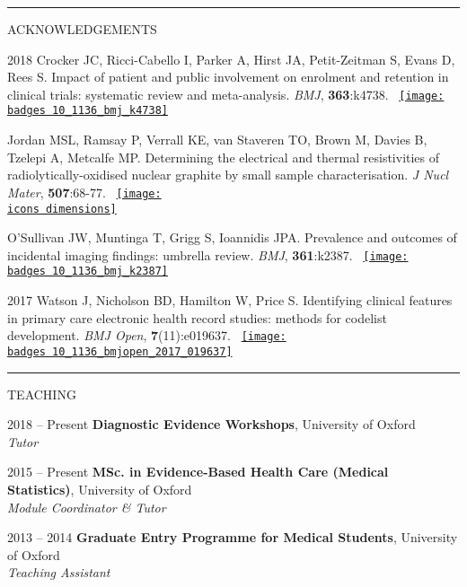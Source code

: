 \documentclass[10pt,a4paper]{article}
\def\badges{./badges/}
\def\icons{./icons/}
\begin{document}
\noindent\rule{\textwidth}{0.4pt}
\begin{cvlist}{ACKNOWLEDGEMENTS}
	
	\item[2018]
	Crocker JC, Ricci-Cabello I, Parker A, Hirst JA, Petit-Zeitman S, Evans D, Rees S. Impact of patient and public involvement on enrolment and retention in clinical trials: systematic review and meta-analysis. \textit{BMJ}, \textbf{363}:k4738. ~\href{https://bmj.altmetric.com/details/51859816}{\texttt{[image: \\badges 10\_1136\_bmj\_k4738]}}
	
	\item[]
	Jordan MSL, Ramsay P, Verrall KE, van Staveren TO, Brown M, Davies B, Tzelepi A, Metcalfe MP. Determining the electrical and thermal resistivities of radiolytically-oxidised nuclear graphite by small sample characterisation. \textit{J Nucl Mater}, \textbf{507}:68-77. ~\href{https://badge.dimensions.ai/details/id/pub.1103593195}{\texttt{[image: \\icons dimensions]}}
	
	\item[]
	O'Sullivan JW, Muntinga T, Grigg S, Ioannidis JPA. Prevalence and outcomes of incidental imaging findings: umbrella review. \textit{BMJ}, \textbf{361}:k2387. ~\href{https://bmj.altmetric.com/details/43831617}{\texttt{[image: \\badges 10\_1136\_bmj\_k2387]}}
	
	\item[2017]
	Watson J, Nicholson BD, Hamilton W, Price S. Identifying clinical features in primary care electronic health record studies: methods for codelist development. \textit{BMJ Open}, \textbf{7}(11):e019637. ~\href{https://bmj.altmetric.com/details/29319273}{\texttt{[image: \\badges 10\_1136\_bmjopen\_2017\_019637]}}
	
\end{cvlist}


\noindent\rule{\textwidth}{0.4pt}
\begin{cvlist}{TEACHING}
	
	\item[2018 -- Present]
	\textbf{Diagnostic Evidence Workshops}, University of Oxford \\
	\textit{Tutor}
	
	\item[2015 -- Present]
	\textbf{MSc. in Evidence-Based Health Care (Medical Statistics)}, University of Oxford \\
	\textit{Module Coordinator \& Tutor}
	
	\item[2013 -- 2014]
	\textbf{Graduate Entry Programme for Medical Students}, University of Oxford \\
	\textit{Teaching Assistant}
	
\end{cvlist}
\end{document}
